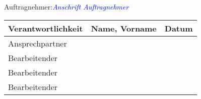 \documentclass[includeheaders]{scrartcl}
\begin{document}
Auftragnehmer:\textcolor{blue}{\itshape{Anschrift Auftragnehmer}}\\

\newpage

\begin{table}[h]
	\center    
    \begin{tabular}{l | l | l}
    Verantwortlichkeit & Name, Vorname & Datum \\
    \hline
    Ansprechpartner    & ~             & ~     \\
    Bearbeitender      & ~             & ~     \\
    Bearbeitender      & ~             & ~     \\
    Bearbeitender      & ~             & ~     \\
    \end{tabular}
\end{table}

\newpage

\newpage

\newpage

\newpage

\newpage

\newpage

\newpage

\newpage

\newpage

\end{document}
